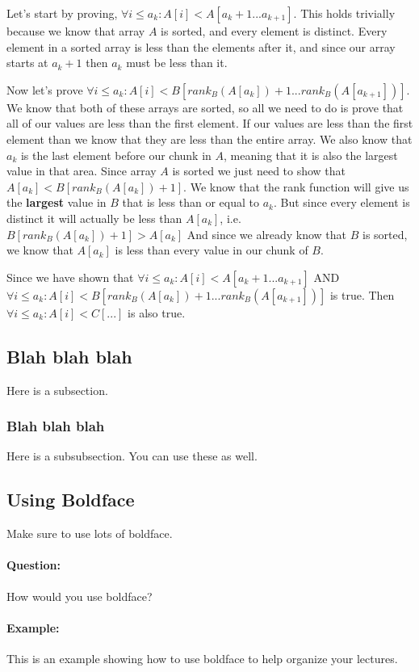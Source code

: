 \documentclass[11pt]{article}
\begin{document}
Let's start by proving, $\forall i \leq a_k : A[i] < A[a_k+1 ... a_{k+1}]$. This holds trivially because we know that array $A$ is sorted, and every element is distinct. Every element in a sorted array is less than the elements after it, and since our array starts at $a_k+1$ then $a_k$ must be less than it.

Now let's prove $\forall i \leq a_k : A[i] < B[rank_B(A[a_k])+1 ... rank_B(A[a_{k+1}])]$. We know that both of these arrays are sorted, so all we need to do is prove that all of our values are less than the first element. If our values are less than the first element than we know that they are less than the entire array. We also know that $a_k$ is the last element before our chunk in $A$, meaning that it is also the largest value in that area. Since array $A$ is sorted we just need to show that $A[a_k] < B[rank_B(A[a_k])+1]$. We know that the rank function will give us the \textbf{largest} value in $B$ that is less than or equal to $a_k$. But since every element is distinct it will actually be less than $A[a_k]$, i.e. $B[rank_B(A[a_k])+1] > A[a_k]$  And since we already know that $B$ is sorted, we know that $A[a_k]$ is less than every value in our chunk of $B$.

Since we have shown that $\forall i \leq a_k : A[i] < A[a_k+1 ... a_{k+1}]$ AND $\forall i \leq a_k : A[i] < B[rank_B(A[a_k])+1 ... rank_B(A[a_{k+1}])]$ is true. Then $\forall i \leq a_k : A[i] < C[...]$ is also true.

\subsection{Blah blah blah}
Here is a subsection.

\subsubsection{Blah blah blah}
Here is a subsubsection. You can use these as well.

\subsection{Using Boldface}
Make sure to use lots of boldface.

\paragraph{Question:}
How would you use boldface?

\paragraph{Example:}
This is an example showing how to use boldface to
help organize your lectures.
\end{document}
